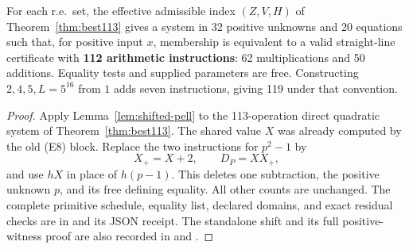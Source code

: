\begin{theorem}\label{thm:best112}
For each r.e.\ set, the effective admissible index $(Z,V,H)$ of
Theorem~\ref{thm:best113} gives a system in 32 positive unknowns and
20 equations such that, for positive input $x$, membership is equivalent
to a valid straight-line certificate with \textbf{112 arithmetic
instructions}: 62 multiplications and 50 additions. Equality tests and
supplied parameters are free. Constructing $2,4,5,L=5^{16}$ from $1$
adds seven instructions, giving 119 under that convention.
\end{theorem}
\begin{proof}
Apply Lemma~\ref{lem:shifted-pell} to the 113-operation direct quadratic
system of Theorem~\ref{thm:best113}. The shared value $X$ was already
computed by the old (E8) block. Replace the two instructions for
$p^2-1$ by
\[
 X_+=X+2,\qquad D_P=XX_+,
\]
and use $hX$ in place of $h(p-1)$. This deletes one subtraction,
the positive unknown $p$, and its free defining equality. All other
counts are unchanged. The complete primitive schedule, equality list,
declared domains, and exact residual checks are in
 and its JSON receipt. The standalone
shift and its full positive-witness proof are also recorded in
 and
.
\end{proof}
